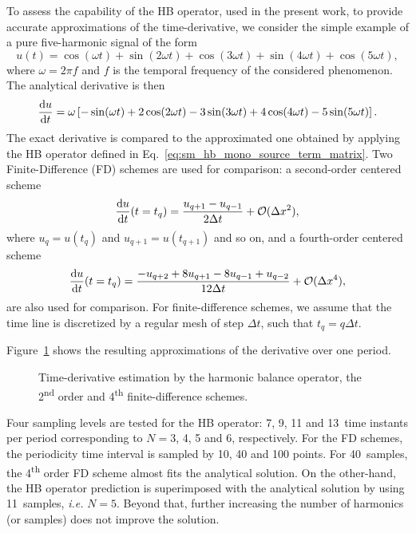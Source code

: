 To assess the capability of the HB operator, used in the present work, to
provide accurate approximations of the time-derivative, 
we consider the simple example of a pure
five-harmonic signal of the form
\begin{equation}
    \label{eq:sum_sin}
    u(t) = \cos(\omega t) + \sin(2 \omega t) +
    \cos(3 \omega t) + \sin(4 \omega t) + \cos(5 \omega t),
\end{equation}
where $\omega = 2 \pi f$ and $f$ is the temporal frequency of
the considered phenomenon.
The analytical derivative is then
\begin{equation}
    \label{eq:sum_sin_deriv}
    \frac{\diff u}{\diff t} = 
    \omega\left[ -\sin(\omega t) + 
    2\cos(2 \omega t) -
    3\sin(3 \omega t) + 
    4\cos(4 \omega t) -
    5\sin(5 \omega t)\right].
\end{equation}
The exact derivative is compared to the approximated one obtained by applying 
the HB operator defined in Eq.~\eqref{eq:sm_hb_mono_source_term_matrix}.
Two Finite-Difference (FD) schemes are used for comparison:
a second-order centered scheme
\begin{equation}
    \frac{\diff u}{\diff t} (t=t_q) =
    \frac{u_{q+1} - u_{q-1}}{2 \Delta t} + \mathcal{O} (\Delta x^2),
    \label{eq:hb_op_center2}
\end{equation}
where $u_q = u(t_q)$ and $u_{q + 1} = u(t_{q + 1})$ and so on,
and a fourth-order centered scheme
\begin{equation}
    \frac{\diff u}{\diff t} (t=t_q) =
    \frac{-u_{q+2} + 8 u_{q+1} - 8 u_{q-1} + u_{q-2}}{12\Delta t}
    + \mathcal{O} (\Delta x^4),
    \label{eq:hb_op_center4}
\end{equation}
are also used for comparison.
For finite-difference schemes, 
we assume that the time line is discretized 
by a regular mesh of step $\Delta t$, such that $t_q = q \Delta t$.

Figure~\ref{fig:hb_operator_sample} shows the resulting approximations 
of the derivative over one period.
\begin{figure}[htp]
  \centering
  \caption{Time-derivative estimation by the harmonic balance operator,
  the 2\textsuperscript{nd} order and 4\textsuperscript{th} finite-difference schemes.}
  \label{fig:hb_operator_sample}
\end{figure}
Four sampling levels
are tested for the HB operator: 7, 9, 11 and 13~time instants per period
corresponding to $N=3$, 4, 5 and 6, respectively.
For the FD schemes, the periodicity time interval is sampled by
10, 40 and 100 points.
For 40~samples, the 4\textsuperscript{th} order FD
scheme almost fits the analytical solution. On the other-hand,
the HB operator prediction is superimposed with the analytical solution
by using 11~samples, \emph{i.e.} $N=5$. Beyond that, further increasing the
number of harmonics (or samples)
does not improve the solution.

